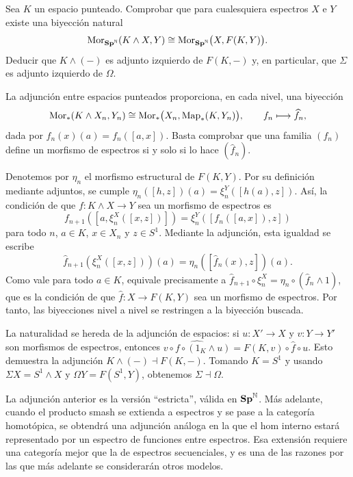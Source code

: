 \begin{ejer}\label{ejer:adjuncion-smash-funciones}
Sea $K$ un espacio punteado. Comprobar que para cualesquiera espectros $X$ e $Y$ existe una biyección natural
\[
\operatorname{Mor}_{\mathbf{Sp}^{\mathbb N}}(K\wedge X,Y)
\cong
\operatorname{Mor}_{\mathbf{Sp}^{\mathbb N}}\bigl(X,F(K,Y)\bigr).
\]
Deducir que $K\wedge(-)$ es adjunto izquierdo de $F(K,-)$ y, en particular, que $\Sigma$ es adjunto izquierdo de $\Omega$.
\end{ejer}
\begin{sol}
La adjunción entre espacios punteados proporciona, en cada nivel, una biyección
\[
\operatorname{Mor}_*(K\wedge X_n,Y_n)
\cong
\operatorname{Mor}_*\bigl(X_n,\operatorname{Map}_*(K,Y_n)\bigr),
\qquad
f_n\longmapsto\widehat f_n,
\]
dada por $\widehat f_n(x)(a)=f_n([a,x])$. Basta comprobar que una familia $(f_n)$ define un morfismo de espectros si y solo si lo hace $(\widehat f_n)$.

Denotemos por $\eta_n$ el morfismo estructural de $F(K,Y)$. Por su definición mediante adjuntos, se cumple $\eta_n([h,z])(a)=\xi_n^Y([h(a),z])$. Así, la condición de que $f\colon K\wedge X\to Y$ sea un morfismo de espectros es
\[
f_{n+1}([a,\xi_n^X([x,z])])
=\xi_n^Y([f_n([a,x]),z])
\]
para todo $n$, $a\in K$, $x\in X_n$ y $z\in S^1$. Mediante la adjunción, esta igualdad se escribe
\[
\widehat f_{n+1}(\xi_n^X([x,z]))(a)
=\eta_n([\widehat f_n(x),z])(a).
\]
Como vale para todo $a\in K$, equivale precisamente a
$\widehat f_{n+1}\circ\xi_n^X
=\eta_n\circ(\widehat f_n\wedge1)$, que es la condición de que $\widehat f\colon X\to F(K,Y)$ sea un morfismo de espectros. Por tanto, las biyecciones nivel a nivel se restringen a la biyección buscada.

La naturalidad se hereda de la adjunción de espacios: si $u\colon X'\to X$ y $v\colon Y\to Y'$ son morfismos de espectros, entonces
$\widehat{v\circ f\circ(1_K\wedge u)}
=F(K,v)\circ\widehat f\circ u$.
Esto demuestra la adjunción $K\wedge(-)\dashv F(K,-)$. Tomando $K=S^1$ y usando $\Sigma X=S^1\wedge X$ y $\Omega Y=F(S^1,Y)$, obtenemos $\Sigma\dashv\Omega$.
\end{sol}

\begin{nota}
   La adjunción anterior es la versión ``estricta'', válida en $\mathbf{Sp}^{\mathbb{N}}$. Más adelante, cuando el producto smash se extienda a espectros y se pase a la categoría homotópica, se obtendrá una adjunción análoga en la que el hom interno estará representado por un espectro de funciones entre espectros. Esa extensión requiere una categoría mejor que la de espectros secuenciales, y es una de las razones por las que más adelante se considerarán otros modelos.
\end{nota}


